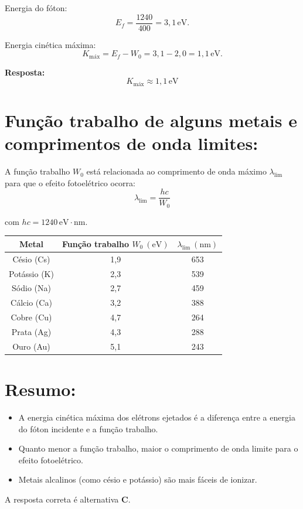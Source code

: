 \documentclass[a4paper,12pt]{article}
\begin{document}
\begin{flushleft}
Energia do fóton:
\[
E_f = \frac{1240}{400} = 3{,}1\,\mathrm{eV}.
\]

Energia cinética máxima:
\[
K_{\text{máx}} = E_f - W_0 = 3{,}1 - 2{,}0 = 1{,}1\,\mathrm{eV}.
\]

\textbf{Resposta:}
\[
\boxed{
K_{\text{máx}} \approx 1{,}1\,\mathrm{eV}
}
\]

\section*{Função trabalho de alguns metais e comprimentos de onda limites:}

A função trabalho \( W_0 \) está relacionada ao comprimento de onda máximo \( \lambda_{\text{lim}} \) para que o efeito fotoelétrico ocorra:
\[
\lambda_{\text{lim}} = \frac{hc}{W_0}
\]

com \( hc = 1240\,\mathrm{eV\cdot nm} \).

\bigskip

\begin{center}
\renewcommand{\arraystretch}{1.3}
\begin{tabular}{|c|c|c|}
\hline
\textbf{Metal} & \textbf{Função trabalho \( W_0~(\mathrm{eV}) \)} & \textbf{\( \lambda_{\text{lim}}~(\mathrm{nm}) \)} \\
\hline
Césio (Cs)     & 1,9 & 653 \\ \hline
Potássio (K)   & 2,3 & 539 \\ \hline
Sódio (Na)     & 2,7 & 459 \\ \hline
Cálcio (Ca)    & 3,2 & 388 \\ \hline
Cobre (Cu)     & 4,7 & 264 \\ \hline
Prata (Ag)     & 4,3 & 288 \\ \hline
Ouro (Au)      & 5,1 & 243 \\ \hline
\hline
\end{tabular}
\end{center}

\section*{Resumo:}
\begin{itemize}
    \item A energia cinética máxima dos elétrons ejetados é a diferença entre a energia do fóton incidente e a função trabalho.
    \item Quanto menor a função trabalho, maior o comprimento de onda limite para o efeito fotoelétrico.
    \item Metais alcalinos (como césio e potássio) são mais fáceis de ionizar.
\end{itemize}

A resposta correta é alternativa \colorbox{green!50}{\textbf{C}}.
\end{flushleft}
\end{document}

